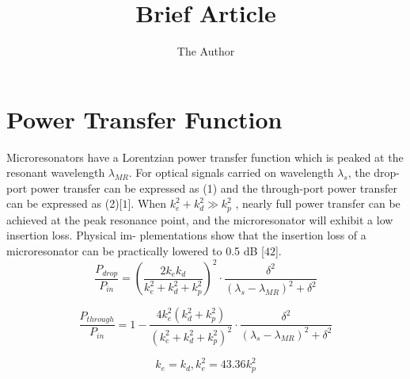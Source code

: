 \documentclass[12pt]{article}
\title{Brief Article}
\author{The Author}
\date{}                                           %
\begin{document}
\maketitle

\section{Power Transfer Function}
	Microresonators have a Lorentzian power transfer function which is peaked at the resonant wavelength $\lambda _{MR}$. For optical signals carried on wavelength $\lambda_{s}$, the drop-port power transfer can be expressed as (1) and the through-port power transfer can be expressed as (2)[$1$]. When   $k_{e}^{2} + k_{d}^{2} \gg k_{p}^2$ , nearly full power transfer can be achieved at the peak resonance point, and the microresonator will exhibit a low insertion loss. Physical im- plementations show that the insertion loss of a microresonator can be practically lowered to 0.5 dB [$42$].
\begin{equation}
\label{drop-port power transfer} 
\frac{P_{drop}}{P_{in}}=\left ( \frac{2k_{e}k_{d}}{k_{e}^2 + k_{d}^2 + k_{p}^2} \right )^2 \cdot \frac{\delta ^2}{\left ( \lambda _{s} -  \lambda _{MR}\right )^2 + \delta ^2}
\end{equation}

\begin{equation}
\label{through-port power transfer} 
\frac{P_{through}}{P_{in}}=1-  \frac{4k_{e}^2(k_{d}^2+k_{p}^2)}{\left ( k_{e}^2 + k_{d}^2 + k_{p}^2 \right )^2} \cdot \frac{\delta ^2}{\left ( \lambda _{s} -  \lambda _{MR}\right )^2 + \delta ^2}
\end{equation}

\begin{equation}
\label{Parameter Detail} 
k_{e} = k_{d}, k_{e}^2 = 43.36 k_{p}^2
\end{equation}

\section{}




\end{document}
